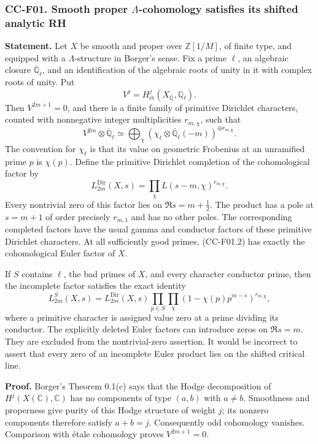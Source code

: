 \documentclass[11pt,a4paper]{article}
\theoremstyle{definition}\newtheorem{definition}[theorem]{Definition}
\theoremstyle{remark}\newtheorem{remark}[theorem]{Remark}
\begin{document}
\subsubsection{\texorpdfstring{CC-F01. Smooth proper
\(\Lambda\)-cohomology satisfies its shifted analytic
RH}{CC-F01. Smooth proper \textbackslash Lambda-cohomology satisfies its shifted analytic RH}}\label{cc-f01.-smooth-proper-lambda-cohomology-satisfies-its-shifted-analytic-rh}

\textbf{Statement.} Let \(X\) be smooth and proper over
\(\mathbb Z[1/M]\), of finite type, and equipped with a
\(\Lambda\)-structure in Borger's sense. Fix a prime \(\ell\), an
algebraic closure \(\overline{\mathbb Q}_\ell\), and an identification
of the algebraic roots of unity in it with complex roots of unity. Put
\[
 V^j=H^j_{\text{ét}}(X_{\overline{\mathbb Q}},\mathbb Q_\ell).
\] Then \(V^{2m+1}=0\), and there is a finite family of primitive
Dirichlet characters, counted with nonnegative integer multiplicities
\(r_{m,\chi}\), such that \[
 V^{2m}\otimes\overline{\mathbb Q}_\ell
 \simeq\bigoplus_\chi(\chi_\ell\otimes\overline{\mathbb Q}_\ell(-m))^{\oplus r_{m,\chi}}.
 \tag{CC-F01.1}
\] The convention for \(\chi_\ell\) is that its value on geometric
Frobenius at an unramified prime \(p\) is \(\chi(p)\). Define the
primitive Dirichlet completion of the cohomological factor by \[
 L^{\mathrm{Dir}}_{2m}(X,s)=\prod_\chi L(s-m,\chi)^{r_{m,\chi}}.
 \tag{CC-F01.2}
\] Every nontrivial zero of this factor lies on \(\Re s=m+\tfrac12\).
The product has a pole at \(s=m+1\) of order precisely \(r_{m,1}\) and
has no other poles. The corresponding completed factors have the usual
gamma and conductor factors of these primitive Dirichlet characters. At
all sufficiently good primes, (CC-F01.2) has exactly the cohomological
Euler factor of \(X\).

If \(S\) contains \(\ell\), the bad primes of \(X\), and every character
conductor prime, then the incomplete factor satisfies the exact identity
\[
 L^S_{2m}(X,s)
 =L^{\mathrm{Dir}}_{2m}(X,s)
   \prod_{p\in S}\prod_\chi
       (1-\chi(p)p^{m-s})^{r_{m,\chi}},
 \tag{CC-F01.3}
\] where a primitive character is assigned value zero at a prime
dividing its conductor. The explicitly deleted Euler factors can
introduce zeros on \(\Re s=m\). They are excluded from the
nontrivial-zero assertion. It would be incorrect to assert that every
zero of an incomplete Euler product lies on the shifted critical line.

\textbf{Proof.} Borger's Theorem 0.1(c) says that the Hodge
decomposition of \(H^j(X(\mathbb C),\mathbb C)\) has no components of
type \((a,b)\) with \(a\ne b\). Smoothness and properness give purity of
this Hodge structure of weight \(j\); its nonzero components therefore
satisfy \(a+b=j\). Consequently odd cohomology vanishes. Comparison with
étale cohomology proves \(V^{2m+1}=0\).
\end{document}
